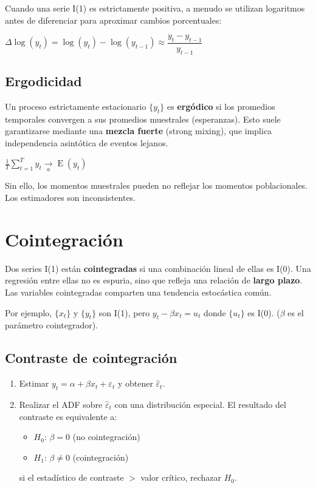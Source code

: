 \documentclass[10pt, a4paper, landscape]{article}
\DeclareMathOperator{\E}{E}
\begin{document}
\begin{multicols}{3}
Cuando una serie I(1) es estrictamente positiva, a menudo se utilizan logaritmos antes de diferenciar para aproximar cambios porcentuales:

\begin{center}
	\( \Delta \log(y_{t}) = \log(y_{t}) - \log(y_{t - 1}) \approx \dfrac{y_t - y_{t - 1}} {y_{t - 1}} \)
\end{center}

\columnbreak

\subsection*{Ergodicidad}

Un proceso estrictamente estacionario \( \{ y_{t} \} \) es \textbf{ergódico} si los promedios temporales convergen a sus promedios muestrales (esperanzas). Esto suele garantizarse mediante una \textbf{mezcla fuerte} (strong mixing), que implica independencia asintótica de eventos lejanos.

\begin{center}
	\( \frac{1}{T} \sum_{t = 1}^{T} y_{t} \underset{a}{\rightarrow} \E(y_{t}) \)
\end{center}

Sin ello, los momentos muestrales pueden no reflejar los momentos poblacionales. Los estimadores son inconsistentes.

\section*{Cointegración}

Dos series I(1) están \textbf{cointegradas} si una combinación lineal de ellas es I(0). Una regresión entre ellas no es espuria, sino que refleja una relación de \textbf{largo plazo}. Las variables cointegradas comparten una tendencia estocástica común.

Por ejemplo, \( \{ x_{t} \} \) y \( \{ y_{t} \} \) son I(1), pero \( y_{t} - \beta x_{t} = u_{t} \) donde \( \{ u_{t} \} \) es I(0). (\( \beta \) es el parámetro cointegrador).

\subsection*{Contraste de cointegración}

\begin{enumerate}[leftmargin=*]
	\item Estimar \( y_{t} = \alpha + \beta x_{t} + \varepsilon_{t} \) y obtener \( \hat{\varepsilon}_{t} \).
	\item Realizar el ADF sobre \( \hat{\varepsilon}_{t} \) con una distribución especial.
	El resultado del contraste es equivalente a:
	\begin{itemize}[leftmargin=*]
		\item \( H_{0} \): \( \beta = 0 \) (no cointegración)
		\item \( H_{1} \): \( \beta \neq 0 \) (cointegración)
	\end{itemize}
	si el estadístico de contraste \( > \) valor crítico, rechazar \( H_{0} \).
\end{enumerate}


\end{multicols}
\end{document}
